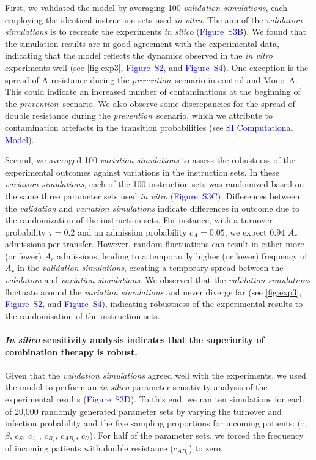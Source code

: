 \documentclass[9pt,twocolumn,twoside,lineno]{pnas-new}
\newcommand{\sifig}[1]{\textcolor{blue}{Figure~S#1}}
\newcommand{\sisec}[1]{\textcolor{blue}{#1}}
\begin{document}
    First, we validated the model by averaging 100 \textit{validation simulations}, each employing the identical instruction sets used \textit{in vitro}.
    The aim of the \textit{validation simulations} is to recreate the experiments \textit{in silico} (\sifig{3B}).
    We found that the simulation results are in good agreement with the experimental data, indicating that the model reflects the dynamics observed in the \textit{in vitro} experiments well (see \autoref{fig:exp3}, \sifig{2}, and \sifig{4}).
    One exception is the spread of A-resistance during the \textit{prevention}~scenario in control and Mono~A.
    This could indicate an increased number of contaminations at the beginning of the \textit{prevention}~scenario.
    We also observe some discrepancies for the spread of double resistance during the \textit{prevention}~scenario, which we attribute to contamination artefacts in the transition probabilities (see \sisec{SI Computational Model}).
    
    Second, we averaged 100 \textit{variation simulations} to assess the robustness of the experimental outcomes against variations in the instruction sets. 
    In these \textit{variation simulations}, each of the 100 instruction sets was randomized based on the same three parameter sets used \textit{in vitro} (\sifig{3C}). 
    Differences between the \textit{validation} and \textit{variation simulations} indicate differences in outcome due to the randomization of the instruction sets.
    For instance, with a turnover probability $\tau = 0.2$ and an admission probability $c_A = 0.05$, we expect $0.94$ $A_r$ admissions per transfer. However, random fluctuations can result in either more (or fewer) $A_r$ admissions, leading to a temporarily higher (or lower) frequency of $A_r$ in the \textit{validation simulations}, creating a temporary spread between the \textit{validation} and \textit{variation simulations}.
    We observed that the \textit{validation simulations} fluctuate around the \textit{variation simulations} and never diverge far (see \autoref{fig:exp3}, \sifig{2}, and \sifig{4}), indicating robustness of the experimental results to the randomisation of the instruction sets.
    
    
    \paragraph{\textit{In silico} sensitivity analysis indicates that the superiority of combination therapy is robust.}
    Given that the \textit{validation simulations} agreed well with the experiments, we used the model to perform an {\it in silico} parameter sensitivity analysis of the experimental results (\sifig{3D}). 
    To this end, we ran ten simulations for each of 20,000 randomly generated parameter sets by varying the turnover and infection probability and the five sampling proportions for incoming patients: ($\tau$, $\beta$, $c_S$, $c_{A_r}$, $c_{B_r}$, $c_{AB_r}$, $c_U$).
    For half of the parameter sets, we forced the frequency of incoming patients with double resistance ($c_{AB_r}$) to zero. 
    
\end{document}
